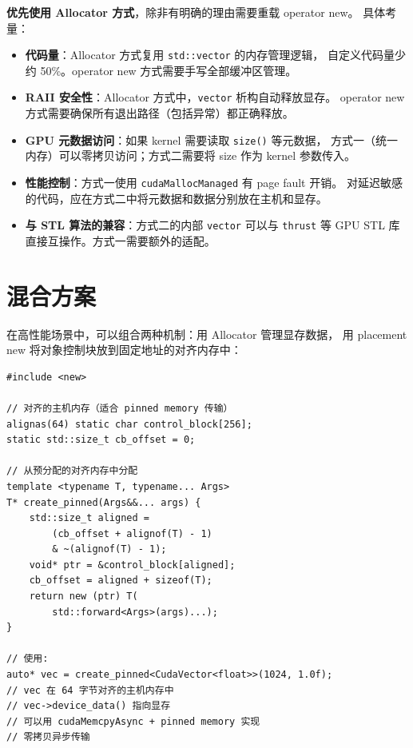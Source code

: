 \documentclass[12pt,a4paper,fontset=fandol]{ctexbook}
\begin{document}
\begin{bestpractice}[title=CUDA 封装方式选择]
\textbf{优先使用 Allocator 方式}，除非有明确的理由需要重载 operator new。
具体考量：

\begin{itemize}
    \item \textbf{代码量}：Allocator 方式复用 \texttt{std::vector} 的内存管理逻辑，
          自定义代码量少约 50\%。operator new 方式需要手写全部缓冲区管理。
    \item \textbf{RAII 安全性}：Allocator 方式中，\texttt{vector} 析构自动释放显存。
          operator new 方式需要确保所有退出路径（包括异常）都正确释放。
    \item \textbf{GPU 元数据访问}：如果 kernel 需要读取 \texttt{size()} 等元数据，
          方式一（统一内存）可以零拷贝访问；方式二需要将 size 作为 kernel 参数传入。
    \item \textbf{性能控制}：方式一使用 \texttt{cudaMallocManaged} 有 page fault 开销。
          对延迟敏感的代码，应在方式二中将元数据和数据分别放在主机和显存。
    \item \textbf{与 STL 算法的兼容}：方式二的内部 \texttt{vector} 可以与
          \texttt{thrust} 等 GPU STL 库直接互操作。方式一需要额外的适配。
\end{itemize}
\end{bestpractice}

\section{混合方案}

在高性能场景中，可以组合两种机制：用 Allocator 管理显存数据，
用 placement new 将对象控制块放到固定地址的对齐内存中：

\begin{lstlisting}
#include <new>

// 对齐的主机内存（适合 pinned memory 传输）
alignas(64) static char control_block[256];
static std::size_t cb_offset = 0;

// 从预分配的对齐内存中分配
template <typename T, typename... Args>
T* create_pinned(Args&&... args) {
    std::size_t aligned =
        (cb_offset + alignof(T) - 1)
        & ~(alignof(T) - 1);
    void* ptr = &control_block[aligned];
    cb_offset = aligned + sizeof(T);
    return new (ptr) T(
        std::forward<Args>(args)...);
}

// 使用:
auto* vec = create_pinned<CudaVector<float>>(1024, 1.0f);
// vec 在 64 字节对齐的主机内存中
// vec->device_data() 指向显存
// 可以用 cudaMemcpyAsync + pinned memory 实现
// 零拷贝异步传输
\end{lstlisting}
\end{document}
